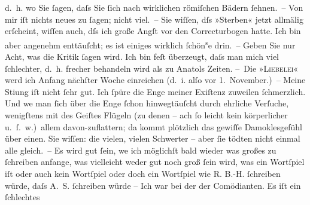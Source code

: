 \begin{ledgroupsized}[t]{13cm}
               d. h. wo Sie ſagen, daſs Sie ſich nach wirklichen römiſchen Bädern ſehnen. –\pend
           \pstart
           Von mir iſt nichts neues zu ſagen; nicht viel. – Sie wiſſen, dſs »Sterben« jetzt allmälig erſcheint, wiſſen auch, dſs ich große
               Angſt vor den Correctur{\pb}bogen hatte. Ich bin aber
               angenehm enttäuſcht; es ist einiges wirklich ſchön\substVorne{}\textsuperscript{s}\substDazwischen{}e\substHinten{} drin. – Geben Sie nur Acht, was die Kritik ſagen wird. Ich bin feſt
               überzeugt, daſs man mich viel ſchlechter, d. h. frecher behandeln wird als zu Anatols Zeiten.\pend
           \pstart
           – Die »\textsc{Liebelei}« werd ich Anfang nächſter Woche einreichen (d. i. alſo vor
                  1. November.) –\pend
           \pstart
           Meine Sti{\geminationm}ung iſt nicht ſehr gut. Ich ſpüre die Enge
               meiner Exiſtenz zuweilen ſchmerzlich. Und we{\geminationn} man ſich
               über die Enge ſchon hinwegtäuſcht durch ehrliche Verſuche, wenigſtens mit des Geiſtes
               Flügeln (zu denen – ach ſo leicht kein körperlicher u. ſ. w.) allem davon-zu{\pb}flattern; da kommt plötzlich das gewiſſe
               Damoklesgefühl über einen. Sie wiſſen: die vielen, vielen Schwerter – aber ſie tödten
               nicht einmal alle gleich. –\pend
           \pstart
           Es wird gut ſein, we{\geminationn} ich möglichſt bald wieder was
               großes zu ſchreiben anfange, was vielleicht weder gut noch groß ſein wird, was ein
               Wortſpiel iſt oder auch kein Wortſpiel oder doch ein Wortſpiel wie \textsc{R. B.-H.}{ }ſchreiben würde, daſs A. S. ſchreiben würde –\pend
           \pstart
           Ich war bei der \label{K_L00392_1v}\label{K_L00392_1h} der Comödianten. Es iſt ein ſchlechtes

\end{ledgroupsized}
